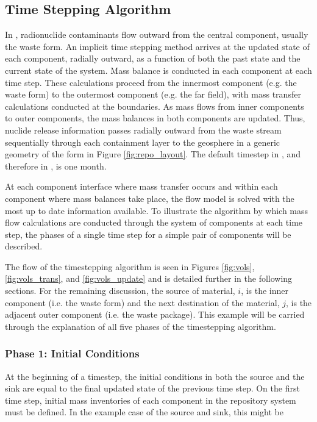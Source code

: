 \subsection{Time Stepping Algorithm}\label{sec:time stepping}

In \Cyder, radionuclide contaminants flow outward from the central component,
usually the waste form. An implicit time stepping method arrives at the updated
state of each component, radially outward, as a function of both the past state
and the current state of the system. Mass balance is conducted in each
component at each time step. These calculations proceed from the innermost
component (e.g. the waste form) to the outermost component (e.g. the far field), with mass transfer calculations conducted
at the boundaries. As mass flows from inner components to outer components, the
mass balances in both components are updated.  Thus, nuclide release
information passes radially outward from the waste stream sequentially through
each containment layer to the geosphere in a generic geometry of the form in
Figure \ref{fig:repo_layout}.
The default timestep in \Cyclus, and therefore in \Cyder, is one month.

At each component interface where mass transfer occurs and within each component
where mass balances take place, the flow model is solved with the most up to
date information available.  To illustrate the algorithm by which mass flow
calculations are conducted through the system of components at each time step,
the phases of a single time step for a simple pair of components will be
described.

The flow of the timestepping algorithm is seen in Figures \ref{fig:vols}, 
\ref{fig:vols_trans}, and \ref{fig:vols_update} and is detailed further in the 
following sections.  For the remaining discussion, the source of material, $i$, is the 
inner component (i.e. the waste form) and the next destination of the material, 
$j$, is the adjacent outer component (i.e. the waste package). This example 
will be carried through the explanation of all five phases of the timestepping 
algorithm. 



\FloatBarrier


\subsubsection{Phase 1: Initial Conditions}

At the beginning of a timestep, the initial conditions in both the source and
the sink are equal to the final updated state of the previous time step.
On the first time step, initial mass inventories of each component in
the repository system must be defined. In the example case of the source and 
sink, this might be

